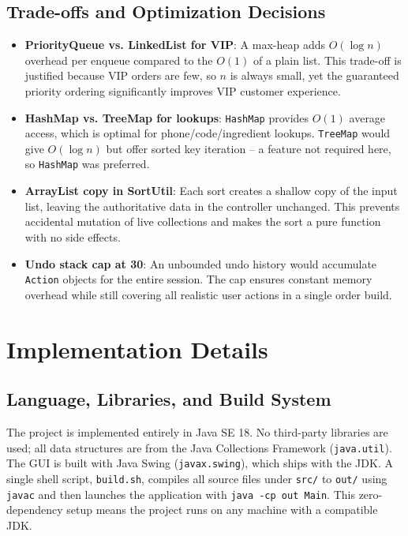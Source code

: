 \documentclass[11pt,a4paper]{article}
\begin{document}
\subsection{Trade-offs and Optimization Decisions}
\begin{itemize}[leftmargin=*]
    \item \textbf{PriorityQueue vs. LinkedList for VIP}: A max-heap adds $O(\log n)$ overhead per enqueue compared to the $O(1)$ of a plain list. This trade-off is justified because VIP orders are few, so $n$ is always small, yet the guaranteed priority ordering significantly improves VIP customer experience.
    \item \textbf{HashMap vs. TreeMap for lookups}: \texttt{HashMap} provides $O(1)$ average access, which is optimal for phone/code/ingredient lookups. \texttt{TreeMap} would give $O(\log n)$ but offer sorted key iteration -- a feature not required here, so \texttt{HashMap} was preferred.
    \item \textbf{ArrayList copy in SortUtil}: Each sort creates a shallow copy of the input list, leaving the authoritative data in the controller unchanged. This prevents accidental mutation of live collections and makes the sort a pure function with no side effects.
    \item \textbf{Undo stack cap at 30}: An unbounded undo history would accumulate \texttt{Action} objects for the entire session. The cap ensures constant memory overhead while still covering all realistic user actions in a single order build.
\end{itemize}

\newpage

\section{Implementation Details}

\subsection{Language, Libraries, and Build System}
The project is implemented entirely in Java SE 18. No third-party libraries are used; all data structures are from the Java Collections Framework (\texttt{java.util}). The GUI is built with Java Swing (\texttt{javax.swing}), which ships with the JDK. A single shell script, \texttt{build.sh}, compiles all source files under \texttt{src/} to \texttt{out/} using \texttt{javac} and then launches the application with \texttt{java -cp out Main}. This zero-dependency setup means the project runs on any machine with a compatible JDK.
\end{document}
